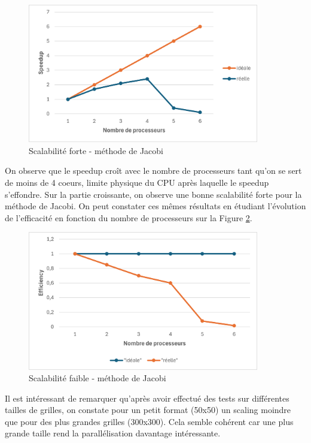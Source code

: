 \documentclass{article}
\begin{document}
\begin{figure}[H]
    \centering
    \includegraphics[width=0.9\textwidth]{strong_scaling_jacobi.png}
    \caption{Scalabilité forte - méthode de Jacobi}
    \label{fig:strongJac}
\end{figure}

On observe que le speedup croît avec le nombre de processeurs tant qu'on se sert de moins de 4 coeurs, limite physique du CPU après laquelle le speedup s'effondre. Sur la partie croissante, on observe une bonne scalabilité forte pour la méthode de Jacobi. On peut constater ces mêmes résultats en étudiant l'évolution de l'efficacité en fonction du nombre de processeurs sur la Figure \ref{fig:weakJac}.

\begin{figure}[H]
    \centering
    \includegraphics[width=0.9\textwidth]{weak_scaling_jacobi.png}
    \caption{Scalabilité faible - méthode de Jacobi}
    \label{fig:weakJac}
\end{figure}

Il est intéressant de remarquer qu'après avoir effectué des tests sur différentes tailles de grilles, on constate pour un petit format (50x50) un scaling moindre que pour des plus grandes grilles (300x300). Cela semble cohérent car une plus grande taille rend la parallélisation davantage intéressante.
\end{document}
